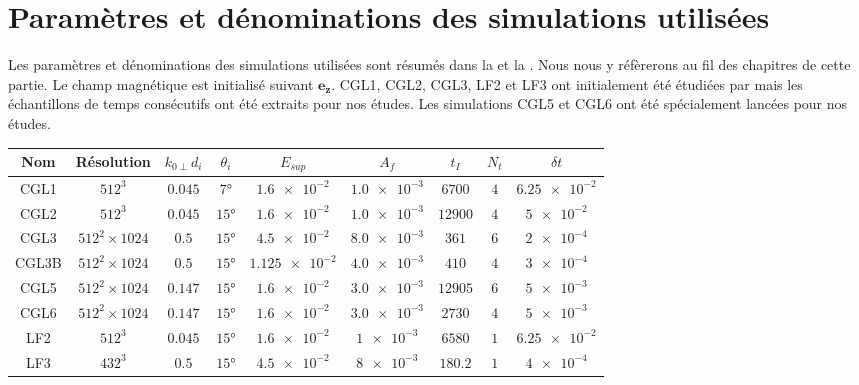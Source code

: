 \section*{Paramètres et dénominations des simulations utilisées}
Les paramètres et dénominations des simulations utilisées sont résumés dans la  et la . Nous nous y réfèrerons au fil des chapitres de cette partie. Le champ magnétique est initialisé suivant $\boldsymbol{e_z}$. CGL1, CGL2, CGL3, LF2 et LF3 ont initialement été étudiées par \cite{ferrand_fluid_2021} mais les échantillons de temps consécutifs ont été extraits pour nos études. Les simulations CGL5 et CGL6 ont été spécialement lancées pour nos études.
 
  \begin{table}[!ht]
 \begin{center}
 \begin{tabular}{ c|c|c|c|c|c|c|c|c } 
 Nom & Résolution & $k_{0 \perp}d_i$ & $\theta_i$ & $E_{sup}$ &  $A_f$ & $t_I$ & $N_t$ & $\delta t$  \\
 \hline
 CGL1 & $512^3$ & $\num{0.045}$ & $\ang{7}$ & $\num{1.6e-2}$ & $\num{1.0e-3}$ & $\num{6700}$ & $\num{4}$ & $\num{6.25e-2}$\\
 CGL2  & $512^3$ & $\num{0.045}$ & $\ang{15}$ & $\num{1.6e-2}$& $\num{1.0e-3}$ & $\num{12900}$ & $\num{4}$ & $\num{5e-2}$ \\
 CGL3 & $512^2 \times 1024$ & $\num{0.5}$ & $\ang{15}$ &  $\num{4.5e-2}$& $\num{8.0e-3}$ & $\num{361}$&$\num{6}$ & $\num{2e-4}$ \\
 CGL3B & $512^2 \times 1024$ & $\num{0.5}$ & $\ang{15}$ &  $\num{1.125e-2}$ &$\num{4.0e-3}$ & $\num{410}$ & $\num{4}$ & $\num{3e-4}$ \\
 CGL5 & $512^2 \times 1024$ & $\num{0.147}$ & $\ang{15}$ & $\num{1.6e-2}$ &$\num{3.0e-3}$  &$\num{12905}$ & $\num{6}$ & $\num{5e-3}$ \\
 CGL6 & $512^2 \times 1024$ & $\num{0.147}$ & $\ang{15}$ & $\num{1.6e-2}$ &$\num{3.0e-3}$  &$\num{2730}$ & $\num{4}$ & $\num{5e-3}$\\
 \hline
 LF2  & $512^3$ & $\num{0.045}$ & $\ang{15}$ & $\num{1.6e-2}$ & $\num{1e-3}$ & $\num{6580}$ &  $\num{1}$ & $\num{6.25e-2}$  \\
 LF3 & $432^3$ & $\num{0.5}$ & $\ang{15}$ & $\num{4.5e-2}$ & $\num{8e-3}$ &$\num{180.2}$  &  $\num{1}$ & $\num{4e-4}$  \\

\end{tabular}
\end{center}
\end{table}
